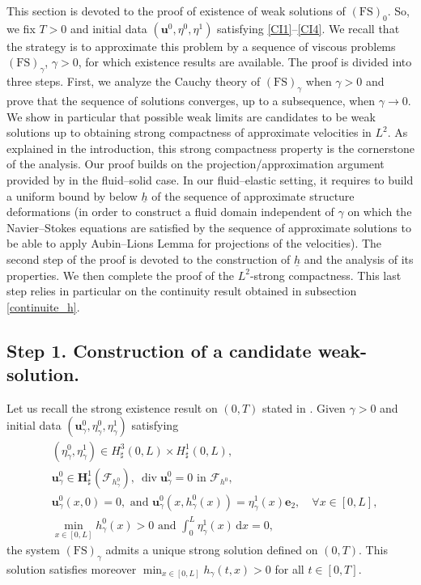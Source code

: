 \documentclass[11pt]{article}
\let\mathcal\mathscr
\newcommand{\FS}{\mathrm{FS}}
\theoremstyle{remark}
\theoremstyle{definition}
\newcommand{\ug}{\boldsymbol{u}}
\newcommand{\dd}{\,\mathrm{d}}
\DeclareMathOperator{\DIV}{div}
\newcommand{\BS}[1]{\boldsymbol{#1}}
\newcommand{\hb}{{\underline{h}}}
\begin{document}
This section is devoted to the proof of existence of weak solutions of $(\FS)_0$.
So, we fix $T>0$ and initial data $(\ug^0,\eta^0,\eta^1)$ satisfying \eqref{CI1}--\eqref{CI4}.
We recall that the strategy is to approximate this problem by a sequence of viscous problems $(\FS)_\gamma$, $\gamma>0$, for which existence results are available. The proof is divided into three steps. First, we analyze the Cauchy theory of $(\FS)_{\gamma}$ when $\gamma >0$ and prove that the sequence of solutions converges, up to a subsequence, when $\gamma \to 0$. We show in particular that possible weak limits are candidates to be weak solutions up to obtaining
strong compactness of approximate velocities in $L^2$. As explained in the introduction, this strong compactness property is the cornerstone of the analysis. Our proof builds on the projection/approximation argument provided by \cite{SanMartin-Starovoitov-Tucsnak}
in the fluid--solid case. In our fluid--elastic setting, it requires to build a uniform bound by below $\hb$ of the sequence
of approximate structure deformations (in order to construct a fluid domain independent of $\gamma$ on which the Navier--Stokes equations are satisfied by the sequence of approximate solutions to be able to apply Aubin--Lions Lemma for projections of the velocities). The second step of the proof is devoted to the construction of $\hb$ and
the analysis of its properties. We then complete the proof of the $L^2$-strong compactness. This last step relies in particular on the continuity result obtained in subsection \ref{continuite_h}.

\subsection{Step 1. Construction of a candidate weak-solution.}
\label{sec:proof1}
Let us recall the strong existence result on $(0,T)$ stated in \cite[Th.\,1]{Grandmont-Hillairet}.
Given $\gamma>0$ and initial data $(\ug_\gamma^{0},\eta_\gamma^{0},\eta_\gamma^{1})$ satisfying
\begin{align}
&(\eta_\gamma^{0},\eta_\gamma^{1})\in H^{3}_{\sharp}(0,L)\times H^{1}_{\sharp}(0,L),\label{CI-gamma1}\\
&\ug_\gamma^{0}\in \BS{H}_{\sharp}^{1}(\mathcal{F}_{h_{\gamma}^{0}}),\ \DIV{\ug_\gamma^{0}}=0\text{ in }\mathcal{F}_{h^{0}},\label{CI-gamma2}\\
&\ug_\gamma^{0}(x,0)=0, \text{ and }\ug_\gamma^{0}(x,h_\gamma^{0}(x))=\eta_\gamma^{1}(x)\BS{e}_{2},\quad \forall x\in [0,L],\label{CI-gamma3}\\
&\min_{x\in[0,L]}h_\gamma^{0}(x)>0\text{ and }\int_{0}^{L}\eta_\gamma^{1}(x)\dd x=0,\label{CI-gamma4}
\end{align}
the system $(\FS)_{\gamma}$ admits a unique strong solution defined on $(0, T)$. This solution satisfies moreover $\min_{x\in [0, L]} h_\gamma(t,x) >0$ for all $t\in [0, T]$.
\end{document}
